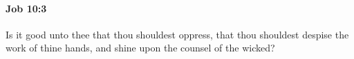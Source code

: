 
		\paragraph{Job 10:3} %
			\label{JOB-10-3}

			Is it good unto thee that thou shouldest oppress, that thou shouldest despise the work of thine hands, and shine upon the counsel of the wicked?


